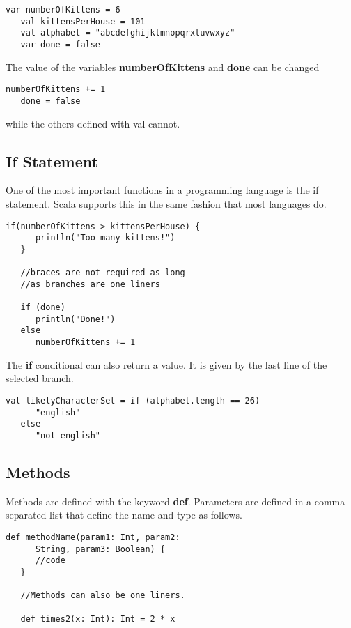 \documentclass[12pt, letterpaper]{report}
\begin{document}
\begin{lstlisting}[style=scala]
   var numberOfKittens = 6
   val kittensPerHouse = 101
   val alphabet = "abcdefghijklmnopqrxtuvwxyz"
   var done = false
\end{lstlisting}

\noindent The value of the variables \textbf{numberOfKittens} and \textbf{done} can be changed

\begin{lstlisting}[style=scala]
   numberOfKittens += 1
   done = false
\end{lstlisting}

\noindent while the others defined with val cannot.
\pagebreak
\subsection{If Statement}
One of the most important functions in a programming language is the if statement. Scala supports this in the same fashion that most languages do.

\begin{lstlisting}[style=scala]
   if(numberOfKittens > kittensPerHouse) {
      println("Too many kittens!")
   }

   //braces are not required as long 
   //as branches are one liners

   if (done) 
      println("Done!")
   else
      numberOfKittens += 1

\end{lstlisting}

\noindent The \textbf{if} conditional can also return a value. It is given by the last line of the selected branch.

\begin{lstlisting}[style=scala]
   val likelyCharacterSet = if (alphabet.length == 26) 
      "english"
   else
      "not english"
\end{lstlisting}

\subsection{Methods}
Methods are defined with the keyword \textbf{def}.
Parameters are defined in a comma separated list that define the name and type as follows.

\begin{lstlisting}[style=scala]
   def methodName(param1: Int, param2: 
      String, param3: Boolean) {
      //code
   }

   //Methods can also be one liners.

   def times2(x: Int): Int = 2 * x 
\end{lstlisting}
\end{document}
